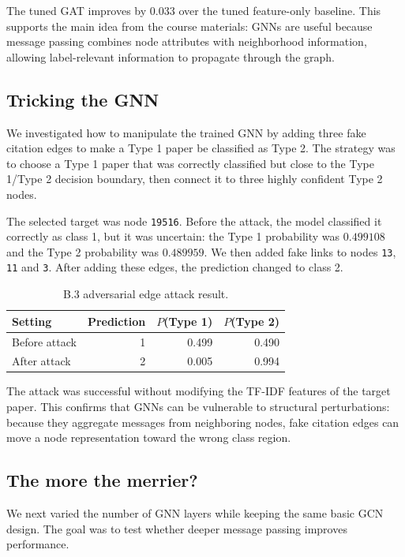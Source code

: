 \documentclass[11pt]{article}
\begin{document}
The tuned GAT improves by $0.033$ over the tuned feature-only baseline. This supports the main idea from the course materials: GNNs are useful because message passing combines node attributes with neighborhood information, allowing label-relevant information to propagate through the graph.

\subsection{Tricking the GNN}

We investigated how to manipulate the trained GNN by adding three fake citation edges to make a Type 1 paper be classified as Type 2. The strategy was to choose a Type 1 paper that was correctly classified but close to the Type 1/Type 2 decision boundary, then connect it to three highly confident Type 2 nodes.

The selected target was node \texttt{19516}. Before the attack, the model classified it correctly as class 1, but it was uncertain: the Type 1 probability was $0.499108$ and the Type 2 probability was $0.489959$. We then added fake links to nodes \texttt{13}, \texttt{11} and \texttt{3}. After adding these edges, the prediction changed to class 2.

\begin{table}[H]
\centering
\caption{B.3 adversarial edge attack result.}
\begin{tabular}{lrrr}
\toprule
Setting & Prediction & $P$(Type 1) & $P$(Type 2) \\
\midrule
Before attack & 1 & 0.499 & 0.490 \\
After attack & 2 & 0.005 & 0.994 \\
\bottomrule
\end{tabular}
\end{table}

The attack was successful without modifying the TF-IDF features of the target paper. This confirms that GNNs can be vulnerable to structural perturbations: because they aggregate messages from neighboring nodes, fake citation edges can move a node representation toward the wrong class region.

\subsection{The more the merrier?}

We next varied the number of GNN layers while keeping the same basic GCN design. The goal was to test whether deeper message passing improves performance.
\end{document}
